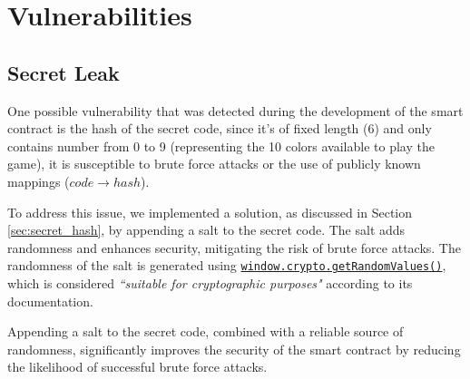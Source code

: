 
\section{Vulnerabilities}


\subsection{Secret Leak}
One possible vulnerability that was detected during the development of the smart contract is the hash of the secret code, since it's of fixed length (6) and only contains number from 0 to 9 (representing the 10 colors available to play the game), it is susceptible to brute force attacks or the use of publicly known mappings ($code \rightarrow hash$). 

To address this issue, we implemented a solution, as discussed in Section \ref{sec:secret_hash}, by appending a salt to the secret code. The salt adds randomness and enhances security, mitigating the risk of brute force attacks. The randomness of the salt is generated using \href{https://developer.mozilla.org/en-US/docs/Web/API/Crypto/getRandomValues}{\texttt{window.crypto.getRandomValues()}}, which is considered \textit{``suitable for cryptographic purposes"} according to its documentation.

Appending a salt to the secret code, combined with a reliable source of randomness, significantly improves the security of the smart contract by reducing the likelihood of successful brute force attacks.


